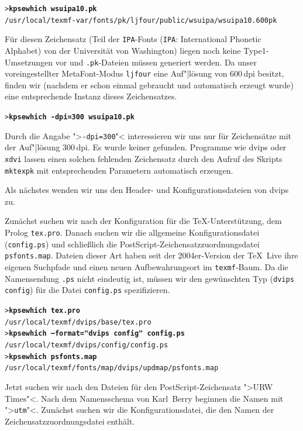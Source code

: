 \documentclass[12pt,ngerman,a4paper,fullparskip]{report}
\newcommand{\TL}{\TeX\ Live\xspace}
\newcommand{\acro}[1]{\texttt{#1}}
\newcommand{\cmdname}[1]{\texttt{#1}}
\newcommand{\code}[1]{\texttt{#1}}
\newcommand{\OnCD}[1]{\texttt{#1}}
\newcommand{\file}[1]{\texttt{#1}}
\newcommand{\Ucom}[1]{\textbf{\texttt{#1}}}
\def\MF{MetaFont}
\providecommand*{\PS}{Post\-Script\xspace}
\begin{document}
\begin{alltt}
> \Ucom{kpsewhich wsuipa10.pk}
 /usr/local/texmf-var/fonts/pk/ljfour/public/wsuipa/wsuipa10.600pk
\end{alltt}
Für diesen Zeichensatz (Teil der \acro{IPA}-Fonts (\acro{IPA}: International Phonetic Alphabet)
von der Universität von Washington) liegen noch keine
Type1-Umsetzungen vor und \code{.pk}-Dateien müssen generiert werden. Da unser voreingestellter \MF-Modus \code{ljfour} eine Auf"|lösung von 600\,dpi besitzt,
finden wir (nachdem er schon einmal gebraucht und automatisch
erzeugt wurde) eine entsprechende Instanz dieses Zeichensatzes.

\begin{alltt}
> \Ucom{kpsewhich -dpi=300 wsuipa10.pk}
\end{alltt}

Durch die Angabe ">\code{-dpi=300}"< interessieren wir uns nur
für Zeichensätze mit der Auf"|lösung 300\,dpi. Es wurde keiner gefunden.
Programme wie dvips oder \cmdname{xdvi} lassen einen solchen fehlenden
Zeichensatz durch den Aufruf des Skripts \cmdname{mktexpk} mit entsprechenden
Parametern automatisch erzeugen.

Als nächstes wenden wir uns den Header- und Konfigurationsdateien
von dvips zu.

Zunächst suchen wir nach der Konfiguration für die \TeX-Unterstützung,
dem Prolog \file{tex.pro}. Danach suchen wir die allgemeine Konfigurationsdatei
(\file{config.ps}) und schließlich die \PS-Zeichensatzzuordnungsdatei
\file{psfonts.map}. Dateien dieser Art haben seit der 2004er-Version der {\TL} ihre eigenen Suchpfade und einen neuen Aufbewahrungsort im \OnCD{texmf}-Baum. Da die Namens\-endung \code{.ps} nicht eindeutig ist,
müssen wir den gewünschten Typ (\code{dvips config})
für die Datei \file{config.ps} spezifizieren.

\begin{alltt}
> \Ucom{kpsewhich tex.pro}
   /usr/local/texmf/dvips/base/tex.pro
> \Ucom{kpsewhich --format="dvips config" config.ps}
   /usr/local/texmf/dvips/config/config.ps
> \Ucom{kpsewhich psfonts.map}
   /usr/local/texmf/fonts/map/dvips/updmap/psfonts.map
\end{alltt}

Jetzt suchen wir nach den Dateien für den \PS-Zeichensatz ">URW Times"<.
Nach dem Namensschema von Karl~Berry beginnen die Namen mit ">\texttt{utm}"<.
Zunächst suchen wir die Konfigurationsdatei, die den Namen der
Zeichensatzzuordnungsdatei enthält.
\end{document}
